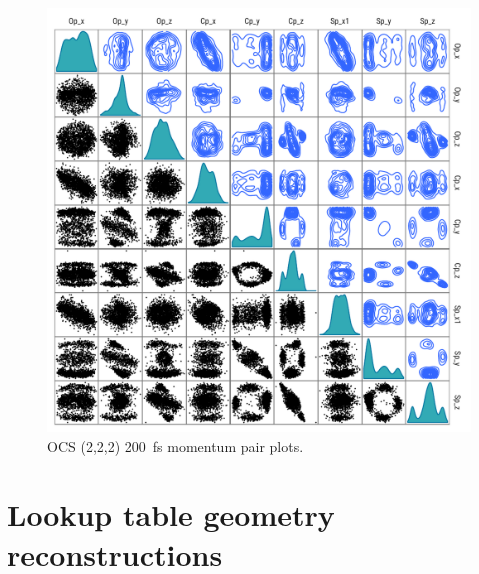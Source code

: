 \begin{figure}
  \centering
  \includegraphics[width=\textwidth]{Plots/OCS222200fsMomentumPairPlots}
  \caption[OCS (2,2,2) \SI{200}{\fs} momentum pair plots.]
  {OCS (2,2,2) \SI{200}{\fs} momentum pair plots.}
  \label{fig:OCS222200fsMomentumPairPlots}
\end{figure}

\section{Lookup table geometry reconstructions}

